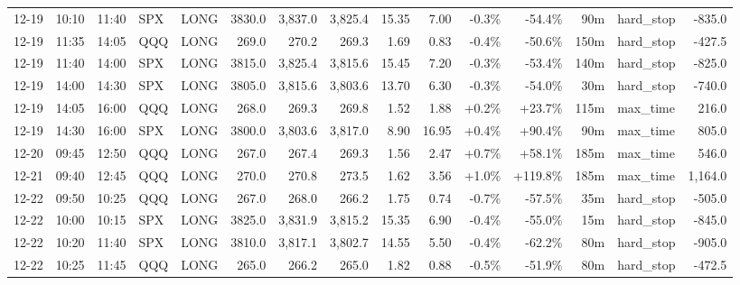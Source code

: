 \documentclass[11pt,a4paper,twoside]{article}
\begin{document}
\begin{landscape}
\begin{center}
\begin{longtable}{>{\color{txtmain}}l l l l l r r r r r r r r >{\color{txtmain}}l r}
12-19 & 10:10 & 11:40 & SPX & LONG & 3830.0 & 3,837.0 & 3,825.4 & 15.35 & 7.00 & \textcolor{lossred}{-0.3\%} & \textcolor{lossred}{-54.4\%} & 90m & hard\_stop & \textcolor{lossred}{-835.0} \\
12-19 & 11:35 & 14:05 & QQQ & LONG & 269.0 & 270.2 & 269.3 & 1.69 & 0.83 & \textcolor{lossred}{-0.4\%} & \textcolor{lossred}{-50.6\%} & 150m & hard\_stop & \textcolor{lossred}{-427.5} \\
12-19 & 11:40 & 14:00 & SPX & LONG & 3815.0 & 3,825.4 & 3,815.6 & 15.45 & 7.20 & \textcolor{lossred}{-0.3\%} & \textcolor{lossred}{-53.4\%} & 140m & hard\_stop & \textcolor{lossred}{-825.0} \\
12-19 & 14:00 & 14:30 & SPX & LONG & 3805.0 & 3,815.6 & 3,803.6 & 13.70 & 6.30 & \textcolor{lossred}{-0.3\%} & \textcolor{lossred}{-54.0\%} & 30m & hard\_stop & \textcolor{lossred}{-740.0} \\
12-19 & 14:05 & 16:00 & QQQ & LONG & 268.0 & 269.3 & 269.8 & 1.52 & 1.88 & \textcolor{wingreen}{+0.2\%} & \textcolor{wingreen}{+23.7\%} & 115m & max\_time & \textcolor{wingreen}{216.0} \\
12-19 & 14:30 & 16:00 & SPX & LONG & 3800.0 & 3,803.6 & 3,817.0 & 8.90 & 16.95 & \textcolor{wingreen}{+0.4\%} & \textcolor{wingreen}{+90.4\%} & 90m & max\_time & \textcolor{wingreen}{805.0} \\
12-20 & 09:45 & 12:50 & QQQ & LONG & 267.0 & 267.4 & 269.3 & 1.56 & 2.47 & \textcolor{wingreen}{+0.7\%} & \textcolor{wingreen}{+58.1\%} & 185m & max\_time & \textcolor{wingreen}{546.0} \\
12-21 & 09:40 & 12:45 & QQQ & LONG & 270.0 & 270.8 & 273.5 & 1.62 & 3.56 & \textcolor{wingreen}{+1.0\%} & \textcolor{wingreen}{+119.8\%} & 185m & max\_time & \textcolor{wingreen}{1,164.0} \\
12-22 & 09:50 & 10:25 & QQQ & LONG & 267.0 & 268.0 & 266.2 & 1.75 & 0.74 & \textcolor{lossred}{-0.7\%} & \textcolor{lossred}{-57.5\%} & 35m & hard\_stop & \textcolor{lossred}{-505.0} \\
12-22 & 10:00 & 10:15 & SPX & LONG & 3825.0 & 3,831.9 & 3,815.2 & 15.35 & 6.90 & \textcolor{lossred}{-0.4\%} & \textcolor{lossred}{-55.0\%} & 15m & hard\_stop & \textcolor{lossred}{-845.0} \\
12-22 & 10:20 & 11:40 & SPX & LONG & 3810.0 & 3,817.1 & 3,802.7 & 14.55 & 5.50 & \textcolor{lossred}{-0.4\%} & \textcolor{lossred}{-62.2\%} & 80m & hard\_stop & \textcolor{lossred}{-905.0} \\
12-22 & 10:25 & 11:45 & QQQ & LONG & 265.0 & 266.2 & 265.0 & 1.82 & 0.88 & \textcolor{lossred}{-0.5\%} & \textcolor{lossred}{-51.9\%} & 80m & hard\_stop & \textcolor{lossred}{-472.5} \\

\end{longtable}
\end{center}
\end{landscape}
\end{document}
